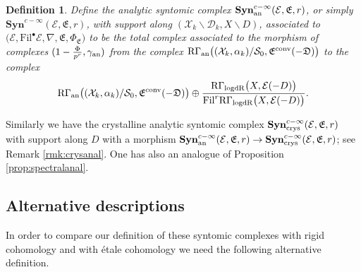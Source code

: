 \documentclass[asterisque,english]{smfart}
\newtheorem{definition}{Definition}[]
\begin{document}
\begin{definition}\label{def:syntomiccompactcomplex} Define the analytic syntomic complex $\mathbf{Syn}_{\rm an}^{c-\infty} (\mathcal{E},\mathfrak{E},r)$, or simply $\mathbf{Syn}^{c-\infty}(\mathcal{E},\mathfrak{E},r)$, with support along $(\mathcal{X}_k\backslash \mathcal{D}_k, X\backslash D)$,   associated to $ \bigl(\mathcal{E},\mathrm{Fil}^\bullet \mathcal{E}, \nabla,\mathfrak{E},\Phi_{\mathfrak{E}}\bigr)$ to be the total complex associated to the morphism  of complexes $(1-\frac{\Phi}{p^r},\gamma_{\rm an})$  from the complex $\mathrm{R}\Gamma_{\mathrm{an}}\bigl((\mathcal{X}_k,\alpha_k)/\mathcal{S}_0,\mathfrak{E}^{\rm conv}(-\mathfrak{D})\bigr)$ to the complex $$ \mathrm{R}\Gamma_{\mathrm{an}}\bigl((\mathcal{X}_k,\alpha_k)/\mathcal{S}_0,\mathfrak{E}^{\rm conv}(-\mathfrak{D})\bigr) \oplus \frac{ \mathrm{R}\Gamma_{\mathrm{logdR}}\bigl(X, \mathcal{E}(-D)\bigr) }{\mathrm{Fil}^r \mathrm{R}\Gamma_{\mathrm{logdR}}\bigl(X, \mathcal{E}(-D)\bigr)}.$$

\end{definition}
Similarly we have the crystalline analytic syntomic complex $\mathbf{Syn}_{\rm crys}^{c-\infty}(\mathcal{E},\mathfrak{E},r)$ with support along $D$ with a morphism 
$\mathbf{Syn}_{\rm an}^{c-\infty}(\mathcal{E},\mathfrak{E},r)\to \mathbf{Syn}_{\rm crys}^{c-\infty}(\mathcal{E},\mathfrak{E},r)$; see Remark \ref{rmk:crysanal}. One has also an analogue of Proposition \ref{prop:spectralanal}.

\smallskip




\subsection{Alternative descriptions}

In order to compare our definition of these syntomic complexes with rigid cohomology and with \'etale cohomology we need the following alternative definition.
\end{document}
